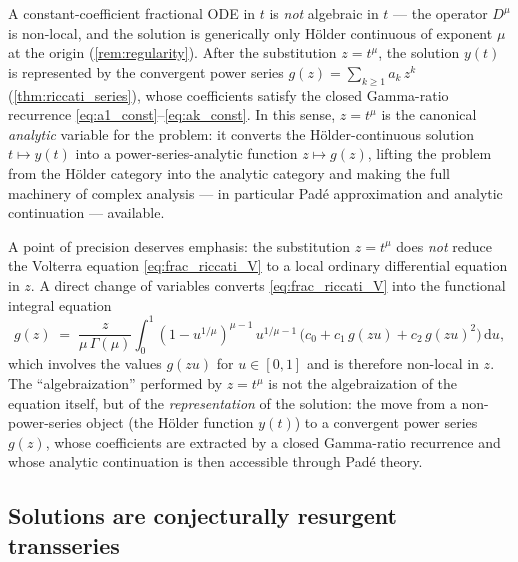 \documentclass[11pt,a4paper]{article}
\newcommand{\dd}{\,\mathrm{d}}
\begin{document}
A constant-coefficient fractional ODE in \(t\) is \emph{not} algebraic in \(t\) --- the operator \(D^\mu\) is non-local, and the solution is generically only H\"older continuous of exponent \(\mu\) at the origin (\cref{rem:regularity}).
After the substitution \(z=t^\mu\), the solution \(y(t)\) is represented by the convergent power series \(g(z)=\sum_{k\ge1}a_k\,z^k\) (\cref{thm:riccati_series}), whose coefficients satisfy the closed Gamma-ratio recurrence \eqref{eq:a1_const}--\eqref{eq:ak_const}.
In this sense, \(z=t^\mu\) is the canonical \emph{analytic} variable for the problem: it converts the H\"older-continuous solution \(t\mapsto y(t)\) into a power-series-analytic function \(z\mapsto g(z)\), lifting the problem from the H\"older category into the analytic category and making the full machinery of complex analysis --- in particular Pad\'e approximation and analytic continuation --- available.

A point of precision deserves emphasis: the substitution \(z=t^\mu\) does \emph{not} reduce the Volterra equation \eqref{eq:frac_riccati_V} to a local ordinary differential equation in \(z\). A direct change of variables converts \eqref{eq:frac_riccati_V} into the functional integral equation
\begin{equation}\label{eq:g_functional}
g(z)\;=\;\frac{z}{\mu\,\Gamma(\mu)}\!\int_0^1(1-u^{1/\mu})^{\mu-1}\,u^{1/\mu-1}\,\bigl(c_0+c_1\,g(zu)+c_2\,g(zu)^2\bigr)\dd u,
\end{equation}
which involves the values \(g(zu)\) for \(u\in[0,1]\) and is therefore non-local in \(z\).
The ``algebraization'' performed by \(z=t^\mu\) is not the algebraization of the equation itself, but of the \emph{representation} of the solution: the move from a non-power-series object (the H\"older function \(y(t)\)) to a convergent power series \(g(z)\), whose coefficients are extracted by a closed Gamma-ratio recurrence and whose analytic continuation is then accessible through Pad\'e theory.

\subsection{Solutions are conjecturally resurgent transseries}
\end{document}
